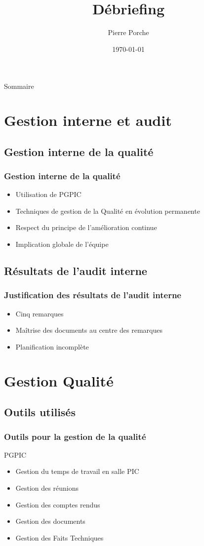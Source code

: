\documentclass[compress,xcolor=dvipsnames]{beamer}
\title{Débriefing \RQ}
\date{\today}
\author{Pierre Porche}
\institute{\insa}
\begin{document}
\begin{frame}[plain]
	\titlepage
\end{frame}

\begin{frame}{Sommaire}
	\tableofcontents[hideallsubsections]
\end{frame}


\section{Gestion interne et audit}
\subsection{Gestion interne de la qualité}
\begin{frame}
\frametitle{Gestion interne de la qualité}
\begin{itemize}
\item Utilisation de PGPIC
\item Techniques de gestion de la Qualité en évolution permanente
\item Respect du principe de l'amélioration continue
\item Implication globale de l'équipe
\end{itemize}
\end{frame}


\subsection{Résultats de l'audit interne}
\begin{frame}
\frametitle{Justification des résultats de l'audit interne}
\begin{itemize}
\item Cinq remarques
\item Maîtrise des documents au centre des remarques
\item Planification incomplète
\end{itemize}
\end{frame}
 

\section{Gestion Qualité}
\subsection{Outils utilisés}
\begin{frame}
\frametitle{Outils pour la gestion de la qualité}
\begin{block}{PGPIC}
\begin{itemize}
\item Gestion du temps de travail en salle PIC
\item Gestion des réunions
\item Gestion des comptes rendus
\item Gestion des documents
\item Gestion des Faits Techniques
\end{itemize}
\end{block}
\end{frame}
\end{document}
